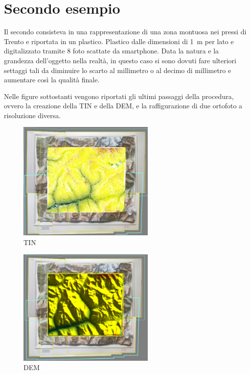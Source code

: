 \section{Secondo esempio} 
Il secondo consisteva in una rappresentazione di una zona montuosa nei pressi di Trento e riportata in un plastico. 
Plastico dalle dimensioni di \SI{1}{\meter} per lato e digitalizzato tramite 8 foto scattate da smartphone.
Data la natura e la grandezza dell'oggetto nella realtà, in questo caso si sono dovuti fare ulteriori settaggi tali da diminuire lo scarto al millimetro o al decimo di millimetro e aumentare così la qualità finale.

Nelle figure sottostanti vengono riportati gli ultimi passaggi della procedura, ovvero la creazione della TIN e della DEM, e la raffigurazione di due ortofoto a risoluzione diversa.
\begin{figure}[htb]
\centering
\includegraphics[width=0.6\textwidth,trim=1cm 2cm 1cm 1cm,clip]{Img/TIN.png}
\caption{TIN}
\end{figure}
\begin{figure}[htb]
\centering
\includegraphics[width=0.6\textwidth,trim=1cm 2cm 1cm 1cm,clip]{Img/DEM.png}
\caption{DEM}
\end{figure}
